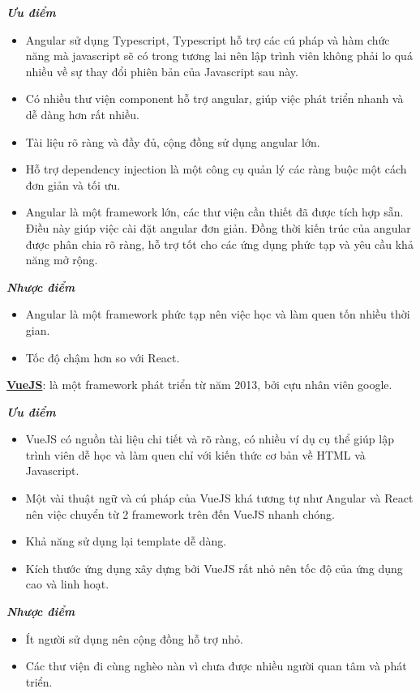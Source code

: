 \documentclass[12pt,a4paper]{article}
\begin{document}
    \textbf{\textit{Ưu điểm}}
    \begin{itemize}
        \item Angular sử dụng Typescript, Typescript hỗ trợ các cú pháp và hàm chức năng mà javascript sẽ có trong tương lai nên lập trình viên không phải lo quá nhiều về sự thay đổi phiên bản của Javascript sau này.
        \item Có nhiều thư viện component hỗ trợ angular, giúp việc phát triển nhanh và dễ dàng hơn rất nhiều.
        \item Tài liệu rõ ràng và đầy đủ, cộng đồng sử dụng angular lớn.
        \item Hỗ trợ dependency injection là một công cụ quản lý các ràng buộc một cách đơn giản và tối ưu.
        \item Angular là một framework lớn, các thư viện cần thiết đã được tích hợp sẵn. Điều này giúp việc cài đặt angular đơn giản. Đồng thời kiến trúc của angular được phân chia rõ ràng, hỗ trợ tốt cho các ứng dụng phức tạp và yêu cầu khả năng mở rộng.
    \end{itemize}

    \textbf{\textit{Nhược điểm}}
    \begin{itemize}
        \item Angular là một framework phức tạp nên việc học và làm quen tốn nhiều thời gian.
        \item Tốc độ chậm hơn so với React.
    \end{itemize}

    \textbf{\underline{VueJS}}: là một framework phát triển từ năm 2013, bởi cựu nhân viên google.

    \textbf{\textit{Ưu điểm}}
    \begin{itemize}
        \item VueJS có nguồn tài liệu chi tiết và rõ ràng, có nhiều ví dụ cụ thể giúp lập trình viên dễ học và làm quen chỉ với kiến thức cơ bản về HTML và Javascript.
        \item Một vài thuật ngữ và cú pháp của VueJS khá tương tự như Angular và React nên việc chuyển từ 2 framework trên đến VueJS nhanh chóng.
        \item Khả năng sử dụng lại template dễ dàng.
        \item Kích thước ứng dụng xây dựng bởi VueJS rất nhỏ nên tốc độ của ứng dụng cao và linh hoạt.
    \end{itemize}

    \textbf{\textit{Nhược điểm}}
    \begin{itemize}
        \item Ít người sử dụng nên cộng đồng hỗ trợ nhỏ.
        \item Các thư viện đi cùng nghèo nàn vì chưa được nhiều người quan tâm và phát triển.
    \end{itemize}
\end{document}
